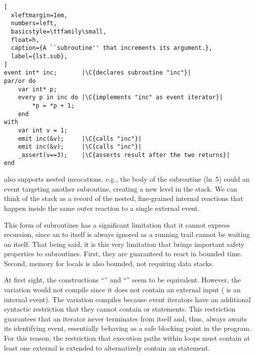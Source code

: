 \begin{lstlisting}[
  xleftmargin=1em,
  numbers=left,
  basicstyle=\ttfamily\small,
  float=h,
  caption={A ``subroutine'' that increments its argument.},
  label={lst.sub},
]
event int* inc;       |\C{declares subroutine "inc"}|
par/or do
    var int* p;
    every p in inc do |\C{implements "inc" as event iterator}|
        *p = *p + 1;
    end
with
    var int v = 1;
    emit inc(&v);     |\C{calls "inc"}|
    emit inc(&v);     |\C{calls "inc"}|
    _assert(v==3);    |\C{asserts result after the two returns}|
end
\end{lstlisting}


\CEU also supports nested  invocations, e.g., the body of the
subroutine  (ln~5) could  an event targeting another
subroutine, creating a new level in the stack.
%
We can think of the stack as a record of the nested, fine-grained internal
reactions that happen inside the same outer reaction to a single external
event.

This form of subroutines has a significant limitation that it cannot express
recursion, since an  to itself is always ignored as a running trail
cannot be waiting on itself.
%
That being said, it is this very limitation that brings important safety
properties to subroutines.
%
First, they are guaranteed to react in bounded time.
%
Second, memory for locals is also bounded, not requiring data stacks.

At first sight, the constructions ``'' and
``'' seem to be equivalent.
However, the  variation would not compile since it does not contain
an external input  ( is an internal event).
%
The  variation compiles because event iterators have an additional
syntactic restriction that they cannot contain  or 
statements.
%
This restriction guarantees that an iterator never terminates from itself and,
thus, always awaits its identifying event, essentially behaving as a safe
blocking point in the program.
%
For this reason, the restriction that execution paths within loops must
contain at least one external  is extended to alternatively contain
an  statement.
%

